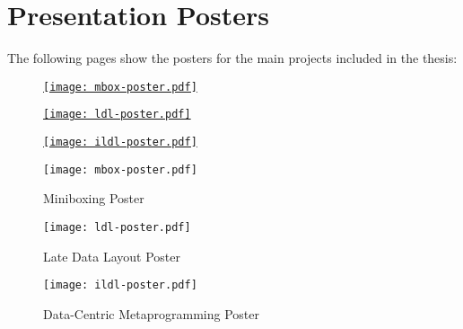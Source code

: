 \appendix
\chapter{Presentation Posters}

\vspace{3em}

The following pages show the posters for the main projects included in the thesis:

\vspace{3em}

\begin{figure}[h!]
\centering
\begin{minipage}{0.33\textwidth}
  \centering
  \href{http://scala-miniboxing.org}{\texttt{[image: mbox-poster.pdf]}}
\end{minipage}\hfill
\begin{minipage}{0.33\textwidth}
  \centering
  \href{http://scala-ldl.org}{\texttt{[image: ldl-poster.pdf]}}
\end{minipage}\hfill
\begin{minipage}{0.33\textwidth}
  \centering
  \href{http://scala-ildl.org}{\texttt{[image: ildl-poster.pdf]}}
\end{minipage}
\end{figure}

\begin{figure}[t]
  \centering
  \vfill
  \texttt{[image: mbox-poster.pdf]}
  \caption{Miniboxing Poster}
\end{figure}

\begin{figure}[t]
  \centering
  \vfill
  \texttt{[image: ldl-poster.pdf]}
  \caption{Late Data Layout Poster}
\end{figure}

\begin{figure}[t]
  \centering
  \vfill
  \texttt{[image: ildl-poster.pdf]}
  \caption{Data-Centric Metaprogramming Poster}
\end{figure}
